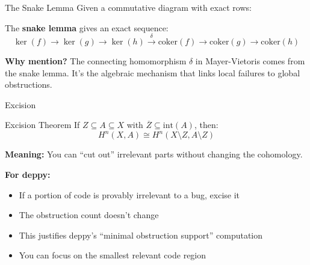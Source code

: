 \documentclass[aspectratio=169,10pt]{beamer}
\begin{document}
\begin{frame}[fragile]{The Snake Lemma}
Given a commutative diagram with exact rows:
\begin{center}
\end{center}

The \textbf{snake lemma} gives an exact sequence:
\[
\ker(f) \to \ker(g) \to \ker(h) \xrightarrow{\delta} \mathrm{coker}(f) \to \mathrm{coker}(g) \to \mathrm{coker}(h)
\]

\textbf{Why mention?} The connecting homomorphism $\delta$ in Mayer-Vietoris comes from the snake lemma. It's the algebraic mechanism that links local failures to global obstructions.
\end{frame}

\begin{frame}{Excision}
\begin{block}{Excision Theorem}
If $Z \subseteq A \subseteq X$ with $\overline{Z} \subseteq \text{int}(A)$, then:
\[
H^n(X, A) \cong H^n(X \setminus Z, A \setminus Z)
\]
\end{block}

\textbf{Meaning:} You can ``cut out'' irrelevant parts without changing the cohomology.

\textbf{For deppy:}
\begin{itemize}
  \item If a portion of code is provably irrelevant to a bug, excise it
  \item The obstruction count doesn't change
  \item This justifies deppy's ``minimal obstruction support'' computation
  \item You can focus on the smallest relevant code region
\end{itemize}
\end{frame}
\end{document}
